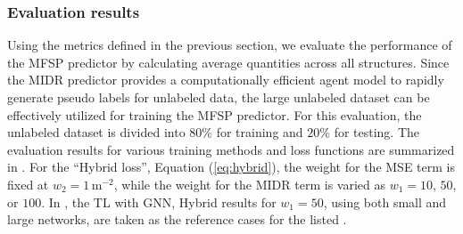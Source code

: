 \subsubsection{Evaluation results}
Using the metrics defined in the previous section, we evaluate the performance of the MFSP predictor by calculating average quantities across all structures. Since the MIDR predictor provides a computationally efficient agent model to rapidly generate pseudo labels for unlabeled data, the large unlabeled dataset can be effectively utilized for training the MFSP predictor. For this evaluation, the unlabeled dataset is divided into $80\%$ for training and $20\%$ for testing. The evaluation results for various training methods and loss functions are summarized in . For the ``Hybrid loss'', Equation (\ref{eq:hybrid}), the weight for the MSE term is fixed at $w_2 = 1 \, \mathrm{m}^{-2}$, while the weight for the MIDR term is varied as $w_1=10$, $50$, or $100$. In , the TL with GNN, Hybrid results for $w_1=50$, using both small and large networks, are taken as the reference cases for the listed .

